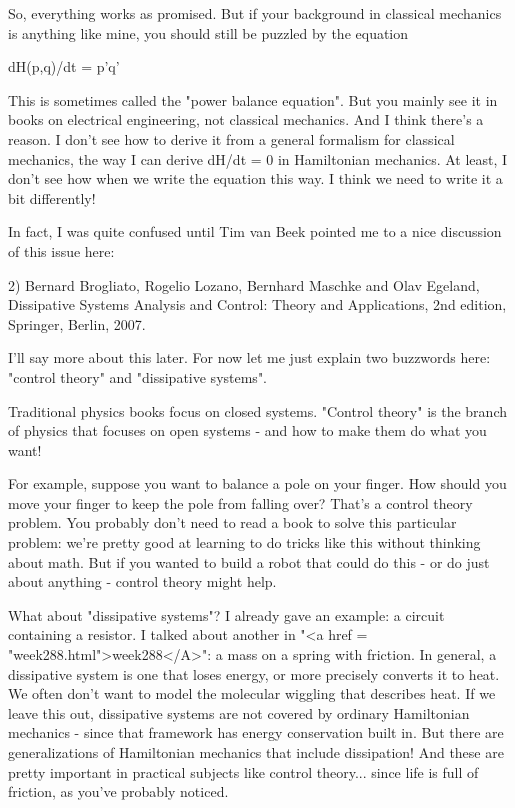 So, everything works as promised.  But if your background in classical
mechanics is anything like mine, you should still be puzzled by the
equation

dH(p,q)/dt = p'q'

This is sometimes called the "power balance equation".  But you mainly
see it in books on electrical engineering, not classical mechanics.
And I think there's a reason.  I don't see how to derive it from a
general formalism for classical mechanics, the way I can derive dH/dt
= 0 in Hamiltonian mechanics.  At least, I don't see how when we write
the equation this way.  I think we need to write it a bit differently!

In fact, I was quite confused until Tim van Beek pointed me to a 
nice discussion of this issue here:

2) Bernard Brogliato, Rogelio Lozano, Bernhard Maschke and Olav
Egeland, Dissipative Systems Analysis and Control: Theory and
Applications, 2nd edition, Springer, Berlin, 2007.

I'll say more about this later.  For now let me just explain two
buzzwords here: "control theory" and "dissipative systems".

Traditional physics books focus on closed systems.  "Control theory"
is the branch of physics that focuses on open systems - and how to
make them do what you want!  

For example, suppose you want to balance a pole on your finger.  How
should you move your finger to keep the pole from falling over?
That's a control theory problem.  You probably don't need to read a
book to solve this particular problem: we're pretty good at learning
to do tricks like this without thinking about math.  But if you wanted
to build a robot that could do this - or do just about anything -
control theory might help.

What about "dissipative systems"?  I already gave an
example: a circuit containing a resistor.  I talked about another in
"<a href = "week288.html">week288</A>": a mass on a spring
with friction.  In general, a dissipative system is one that loses
energy, or more precisely converts it to heat.  We often don't want to
model the molecular wiggling that describes heat.  If we leave this
out, dissipative systems are not covered by ordinary Hamiltonian
mechanics - since that framework has energy conservation built in.
But there are generalizations of Hamiltonian mechanics that include
dissipation!  And these are pretty important in practical subjects
like control theory... since life is full of friction, as you've
probably noticed.

